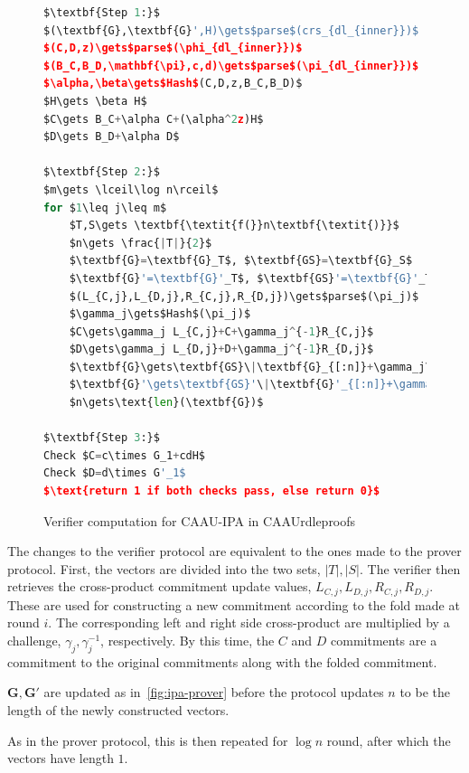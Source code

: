 \begin{figure}[ht]
\begin{framed}
\begin{lstlisting}[language=Python,mathescape=true,label={lst:ipa-verifier}]
$\textbf{Step 1:}$
$(\textbf{G},\textbf{G}',H)\gets$parse$(crs_{dl_{inner}})$
$(C,D,z)\gets$parse$(\phi_{dl_{inner}})$
$(B_C,B_D,\mathbf{\pi},c,d)\gets$parse$(\pi_{dl_{inner}})$
$\alpha,\beta\gets$Hash$(C,D,z,B_C,B_D)$
$H\gets \beta H$
$C\gets B_C+\alpha C+(\alpha^2z)H$
$D\gets B_D+\alpha D$

$\textbf{Step 2:}$
$m\gets \lceil\log n\rceil$
for $1\leq j\leq m$
    $T,S\gets \textbf{\textit{f(}}n\textbf{\textit{)}}$
    $n\gets \frac{|T|}{2}$
    $\textbf{G}=\textbf{G}_T$, $\textbf{GS}=\textbf{G}_S$
    $\textbf{G}'=\textbf{G}'_T$, $\textbf{GS}'=\textbf{G}'_T$
    $(L_{C,j},L_{D,j},R_{C,j},R_{D,j})\gets$parse$(\pi_j)$
    $\gamma_j\gets$Hash$(\pi_j)$
    $C\gets\gamma_j L_{C,j}+C+\gamma_j^{-1}R_{C,j}$
    $D\gets\gamma_j L_{D,j}+D+\gamma_j^{-1}R_{D,j}$
    $\textbf{G}\gets\textbf{GS}\|\textbf{G}_{[:n]}+\gamma_j\textbf{G}_{[n:]}$
    $\textbf{G}'\gets\textbf{GS}'\|\textbf{G}'_{[:n]}+\gamma_j^{-1}\textbf{G}'_{[n:]}$
    $n\gets\text{len}(\textbf{G})$

$\textbf{Step 3:}$
Check $C=c\times G_1+cdH$
Check $D=d\times G'_1$
$\text{return 1 if both checks pass, else return 0}$
\end{lstlisting}
\end{framed}
\caption{Verifier computation for CAAU-IPA in CAAUrdleproofs}
\label{fig:ipa-verifier}
\end{figure}

The changes to the verifier protocol are equivalent to the ones made to the prover protocol.
First, the vectors are divided into the two sets, $|T|,|S|$.
The verifier then retrieves the cross-product commitment update values, $L_{C,j},L_{D,j},R_{C,j},R_{D,j}$.
These are used for constructing a new commitment according to the fold made at round $i$.
The corresponding left and right side cross-product are multiplied by a challenge, $\gamma_j,\gamma_j^{-1}$, respectively.
By this time, the $C$ and $D$ commitments are a commitment to the original commitments along with the folded commitment.

$\mathbf{G,G'}$ are updated as in~\autoref{fig:ipa-prover} before the protocol updates $n$ to be the length of the newly constructed vectors.

As in the prover protocol, this is then repeated for $\log n$ round, after which the vectors have length $1$.

